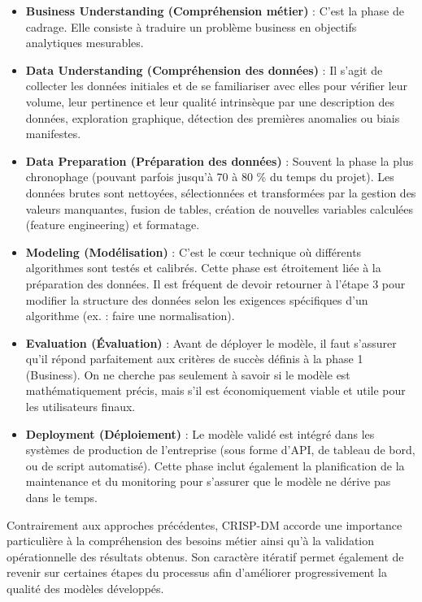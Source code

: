 \begin{itemize}
    \item \textbf{Business Understanding (Compréhension métier)} : C'est la phase de cadrage. Elle consiste à traduire un problème business en objectifs analytiques mesurables.
    
    \item \textbf{Data Understanding (Compréhension des données)} : Il s'agit de collecter les données initiales et de se familiariser avec elles pour vérifier leur volume, leur pertinence et leur qualité intrinsèque par une description des données, exploration graphique, détection des premières anomalies ou biais manifestes.
    
    \item \textbf{Data Preparation (Préparation des données)} : Souvent la phase la plus chronophage (pouvant parfois jusqu'à 70 à 80 \% du temps du projet). Les données brutes sont nettoyées, sélectionnées et transformées par la gestion des valeurs manquantes, fusion de tables, création de nouvelles variables calculées (feature engineering) et formatage.
    
    \item \textbf{Modeling (Modélisation)} : C'est le cœur technique où différents algorithmes sont testés et calibrés. Cette phase est étroitement liée à la préparation des données. Il est fréquent de devoir retourner à l'étape 3 pour modifier la structure des données selon les exigences spécifiques d'un algorithme (ex. : faire une normalisation).
    
    \item \textbf{Evaluation (Évaluation)} : Avant de déployer le modèle, il faut s'assurer qu'il répond parfaitement aux critères de succès définis à la phase 1 (Business). On ne cherche pas seulement à savoir si le modèle est mathématiquement précis, mais s'il est économiquement viable et utile pour les utilisateurs finaux.
    
    \item \textbf{Deployment (Déploiement)} : Le modèle validé est intégré dans les systèmes de production de l'entreprise (sous forme d'API, de tableau de bord, ou de script automatisé). Cette phase inclut également la planification de la maintenance et du monitoring pour s'assurer que le modèle ne dérive pas dans le temps.
\end{itemize}
 
Contrairement aux approches précédentes, CRISP-DM accorde une importance particulière à la compréhension des besoins métier ainsi qu'à la validation opérationnelle des résultats obtenus. Son caractère itératif permet également de revenir sur certaines étapes du processus afin d'améliorer progressivement la qualité des modèles développés.

